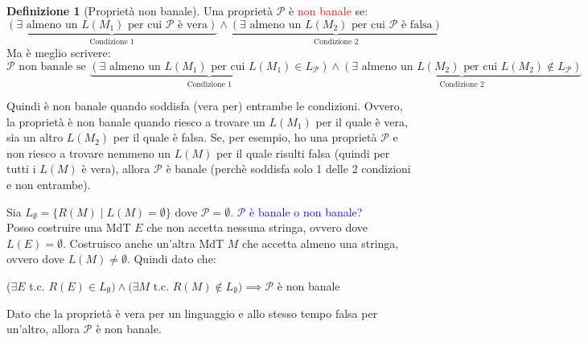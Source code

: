 \documentclass{article}  %
\theoremstyle{definition}
\newtheorem{definition}{Definizione}[section]
\begin{document}
\begin{definition}[Proprietà non banale]
	Una proprietà $\mathscr{P}$ è \textcolor{red}{non banale} se:
	\[
		\underbrace{(\exists \text{ almeno un $L(M_1)$ per cui } \mathscr{P} \text{ è vera})}_{\text{Condizione 1}}
		\land
		\underbrace{(\exists \text{ almeno un $L(M_2)$ per cui } \mathscr{P} \text{ è falsa})}_{\text{Condizione 2}}
	\]
	Ma è meglio scrivere:
	\[
		\mathscr{P} \text{ non banale se }
		\underbrace{(\exists \text{ almeno un $L(M_1)$ per cui } L(M_1) \in L_{\mathscr{P}})}_{\text{Condizione 1}}
		\land
		\underbrace{(\exists \text{ almeno un $L(M_2)$ per cui } L(M_2) \notin L_{\mathscr{P}})}_{\text{Condizione 2}}
	\]

	Quindi è non banale quando soddisfa (vera per) entrambe le condizioni. Ovvero, la proprietà è non banale
	quando riesco a trovare un $L(M_1)$ per il quale è vera, sia un altro $L(M_2)$ per il quale è falsa.
	Se, per esempio, ho una proprietà $\mathscr{P}$ e non riesco a trovare nemmeno un $L(M)$ per il quale risulti falsa (quindi per tutti i $L(M)$ è vera),
	allora $\mathscr{P}$ è banale (perchè soddisfa solo 1 delle 2 condizioni e non entrambe).
\end{definition}
\begin{esempio}[Esempio]
	\footnotesize %
	Sia $L_{\emptyset}=\{R(M) \mid L(M) = \emptyset\}$ dove $\mathscr{P}=\emptyset$. \textcolor{blue}{$\mathscr{P}$ è banale o non banale?} \\
	Posso costruire una MdT $E$ che non accetta nessuna stringa, ovvero dove $L(E)=\emptyset$. Costruisco anche un'altra MdT $M$ che accetta almeno
	una stringa, ovvero dove $L(M)\neq\emptyset$. Quindi dato che:
	\begin{center}
		($\exists E$ t.c. $R(E) \in L_{\emptyset}) \land (\exists M$ t.c. $R(M)\notin L_{\emptyset}) \implies \mathscr{P}$ è non banale
	\end{center}
	Dato che la proprietà è vera per un linguaggio e allo stesso tempo falsa per un'altro, allora $\mathscr{P}$ è non banale.
\end{esempio}
\end{document}
